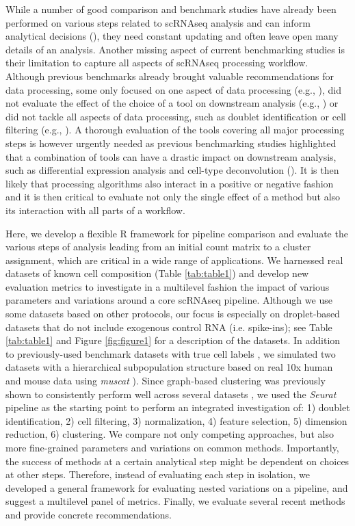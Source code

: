 \documentclass{bmcart}
\begin{document}
While a number of good comparison and benchmark studies have already been performed on various steps related to scRNAseq analysis and can inform analytical decisions (\citealp{duoClustering2018, SonesonDE2018, SunDimRed2019}), they need constant updating and often leave open many details of an analysis. Another missing aspect of current benchmarking studies is their limitation to capture all aspects of scRNAseq processing workflow. Although previous benchmarks already brought valuable recommendations for data processing, some only focused on one aspect of data processing (e.g., \citealp{SunDimRed2019}), did not evaluate the effect of the choice of a tool on downstream analysis (e.g., \citealp{TsuyuzakiPCA2020}) or did not tackle all aspects of data processing, such as doublet identification or cell filtering (e.g., \citealp{viethSystematic2019}). A thorough evaluation of the tools covering all major processing steps is however urgently needed as previous benchmarking studies highlighted that a combination of tools can have a drastic impact on downstream analysis, such as differential expression analysis and cell-type deconvolution (\citealp{viethSystematic2019, CobosDeconvolution2020}). It is then likely that processing algorithms also interact in a positive or negative fashion and it is then critical to evaluate not only the single effect of a method but also its interaction with all parts of a workflow. 

Here, we develop a flexible R framework for pipeline comparison and evaluate the various steps of analysis leading from an initial count matrix to a cluster assignment, which are critical in a wide range of applications. We harnessed real datasets of known cell composition (Table \ref{tab:table1}) and develop new evaluation metrics to investigate in a multilevel fashion the impact of various parameters and variations around a core scRNAseq pipeline. Although we use some datasets based on other protocols, our focus is especially on droplet-based datasets that do not include exogenous control RNA (i.e. spike-ins); see Table \ref{tab:table1} and Figure \ref{fig:figure1} for a description of the datasets. In addition to previously-used benchmark datasets with true cell labels \cite{duoClustering2018,tianMixology2018}, we simulated two datasets with a hierarchical subpopulation structure based on real 10x human and mouse data using \textit{muscat} \cite{CrowellMuscat2019}). 
Since graph-based clustering \cite{satijaSeurat2015} was previously shown to consistently perform well across several datasets \cite{duoClustering2018,tianMixology2018}, we used the \textit{Seurat} pipeline as the starting point to perform an integrated investigation of: 1) doublet identification, 2) cell filtering, 3) normalization, 4) feature selection, 5) dimension reduction, 6) clustering. We compare not only competing approaches, but also more fine-grained parameters and variations on common methods. Importantly, the success of methods at a certain analytical step might be dependent on choices at other steps. Therefore, instead of evaluating each step in isolation, we developed a general framework for evaluating nested variations on a pipeline, and suggest a multilevel panel of metrics. Finally, we evaluate several recent methods and provide concrete recommendations.
\end{document}
